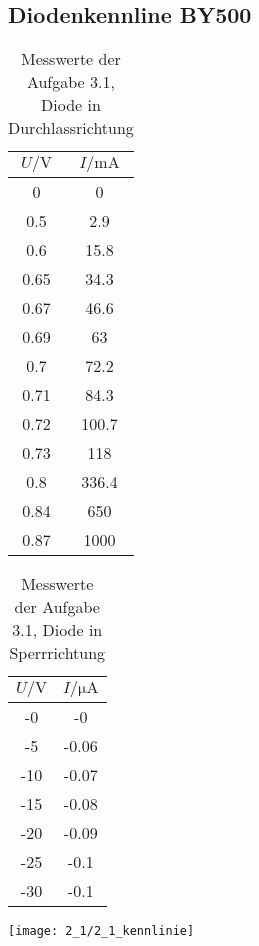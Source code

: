 \documentclass[a4paper, 12pt]{article}
\begin{document}
\subsection{Diodenkennline BY500}
\begin{table}[H]
\begin{center}
\begin{tabular}{@{}c|c@{}}
\toprule
$U / \si{\volt}$    & $I / \si{\milli\ampere}$     \\ \midrule
0    & 0     \\
0.5  & 2.9   \\
0.6  & 15.8  \\
0.65 & 34.3  \\
0.67 & 46.6  \\
0.69 & 63    \\
0.7  & 72.2  \\
0.71 & 84.3  \\
0.72 & 100.7 \\
0.73 & 118   \\
0.8  & 336.4 \\
0.84 & 650   \\
0.87 & 1000  \\ \bottomrule
\end{tabular}
\end{center}
\caption{Messwerte der Aufgabe 3.1, Diode in Durchlassrichtung}
\end{table}

\begin{table}[H]
  \begin{center}
\begin{tabular}{@{}c|c@{}}
\toprule
$U / \si{\volt}$  & $I / \si{\micro\ampere}$    \\ \midrule
-0  & -0    \\
-5  & -0.06 \\
-10 & -0.07 \\
-15 & -0.08 \\
-20 & -0.09 \\
-25 & -0.1  \\
-30 & -0.1  \\ \bottomrule
\end{tabular}
  \end{center}
\caption{Messwerte der Aufgabe 3.1, Diode in Sperrrichtung}
\end{table}

\begin{center}
 \texttt{[image: 2\_1/2\_1\_kennlinie]}
\end{center}
\end{document}
